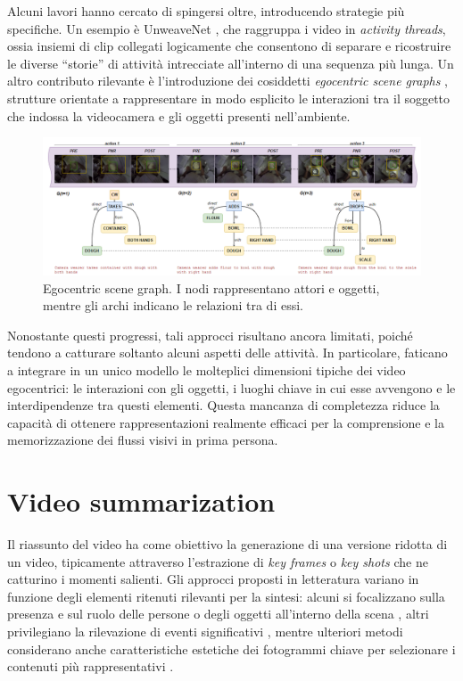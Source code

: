 Alcuni lavori hanno cercato di spingersi oltre, introducendo strategie più specifiche. Un esempio è UnweaveNet \cite{price2022unweavenetunweavingactivitystories}, che raggruppa i video in \emph{activity threads}, ossia insiemi di clip collegati logicamente che consentono di separare e ricostruire le diverse “storie” di attività intrecciate all'interno di una sequenza più lunga. Un altro contributo rilevante è l'introduzione dei cosiddetti \emph{egocentric scene graphs} \cite{rodin2023actionscenegraphslongform}, strutture orientate a rappresentare in modo esplicito le interazioni tra il soggetto che indossa la videocamera e gli oggetti presenti nell'ambiente.

\begin{figure}[H]
    \centering
    \includegraphics[width=1\textwidth]{Images/ego_graph.png}
    \caption{Egocentric scene graph. I nodi rappresentano attori e oggetti, mentre gli archi indicano le relazioni tra di essi.}
    \label{fig:ego_scene_graph}
\end{figure}

Nonostante questi progressi, tali approcci risultano ancora limitati, poiché tendono a catturare soltanto alcuni aspetti delle attività. In particolare, faticano a integrare in un unico modello le molteplici dimensioni tipiche dei video egocentrici: le interazioni con gli oggetti, i luoghi chiave in cui esse avvengono e le interdipendenze tra questi elementi. Questa mancanza di completezza riduce la capacità di ottenere rappresentazioni realmente efficaci per la comprensione e la memorizzazione dei flussi visivi in prima persona.

\section{Video summarization}

Il riassunto del video ha come obiettivo la generazione di una versione ridotta di un video, tipicamente attraverso l'estrazione di \emph{key frames} o \emph{key shots} che ne catturino i momenti salienti. Gli approcci proposti in letteratura variano in funzione degli elementi ritenuti rilevanti per la sintesi: alcuni si focalizzano sulla presenza e sul ruolo delle persone o degli oggetti all'interno della scena \cite{6247820}, altri privilegiano la rilevazione di eventi significativi \cite{Lu_2013_CVPR}, mentre ulteriori metodi considerano anche caratteristiche estetiche dei fotogrammi chiave per selezionare i contenuti più rappresentativi \cite{10.1007/978-3-319-10602-1_19}. 

